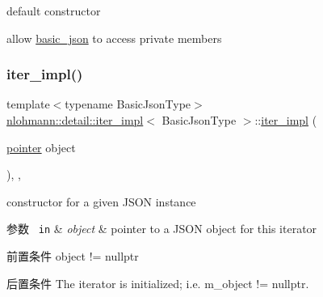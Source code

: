 default constructor 

allow \mbox{\hyperlink{classnlohmann_1_1basic__json}{basic\+\_\+json}} to access private members \mbox{\label{classnlohmann_1_1detail_1_1iter__impl_a88a00484ac201c52fc5f613d88a2918b}} 
\subsubsection{\texorpdfstring{iter\_impl()}{iter\_impl()}\hspace{0.1cm}{\footnotesize\ttfamily [2/4]}}
{\footnotesize\ttfamily template$<$typename Basic\+Json\+Type$>$ \\
\mbox{\hyperlink{classnlohmann_1_1detail_1_1iter__impl}{nlohmann\+::detail\+::iter\+\_\+impl}}$<$ Basic\+Json\+Type $>$\+::\mbox{\hyperlink{classnlohmann_1_1detail_1_1iter__impl}{iter\+\_\+impl}} (\begin{DoxyParamCaption}\item[{\mbox{\hyperlink{classnlohmann_1_1detail_1_1iter__impl_a69e52f890ce8c556fd68ce109e24b360}{pointer}}}]{object }\end{DoxyParamCaption})\hspace{0.3cm}{\ttfamily [inline]}, {\ttfamily [explicit]}, {\ttfamily [noexcept]}}



constructor for a given J\+S\+ON instance 


\begin{DoxyParams}[1]{参数}
\mbox{\texttt{ in}}  & {\em object} & pointer to a J\+S\+ON object for this iterator \\
\hline
\end{DoxyParams}
\begin{DoxyPrecond}{前置条件}
object != nullptr 
\end{DoxyPrecond}
\begin{DoxyPostcond}{后置条件}
The iterator is initialized; i.\+e. {\ttfamily m\+\_\+object != nullptr}. 
\end{DoxyPostcond}
\mbox{\label{classnlohmann_1_1detail_1_1iter__impl_a71f84fb6e009619f12972bcf9002b8cd}} 
